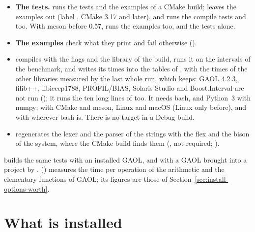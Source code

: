 \documentclass[12pt,a4paper,twoside,openright]{book}
\begin{document}
\begin{itemize}
\item[$\bullet$] \textbf{The tests.}  runs the tests and the
  examples of a CMake build;  leaves the examples out (label
  , CMake 3.17 and later), and runs the compile tests
   and  too. With meson before 0.57,
   runs the examples too, and 
  the tests alone.
\item[$\bullet$] \textbf{The examples} check what they print and fail
  otherwise ().
\item[$\bullet$] \textbf{} compiles
   with the flags and the library of
  the build, runs it on the intervals of the benchmark, and writes its times
  into the tables of , with the times of the
  other libraries measured by the last whole run, which
   keeps: GAOL 4.2.3, filib++,
  libieeep1788, PROFIL/BIAS, Solaris Studio and Boost.Interval are not run
  (); it runs the ten long lines of
   too. It needs bash, and Python~3 with
  numpy; with CMake and meson, Linux and macOS (Linux only before), and with
   wherever bash is. There is no target  in a Debug
  build.\newinvfive
\item[$\bullet$] \textbf{} regenerates the lexer and the
  parser of the strings with the flex and the bison of the system, where the
  CMake build finds them (, not required;
  ).
\end{itemize}

\noindent
{} builds the same tests with an installed GAOL, and
 with a GAOL brought into a project by
.  ()
measures the time per operation of the arithmetic and the elementary
functions of GAOL; its figures are those of
Section~\ref{sec:install-options-worth}.

\section{What is installed}\label{sec:install-installed}
\end{document}
